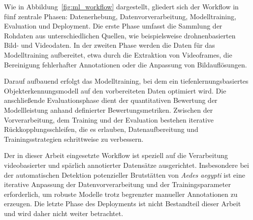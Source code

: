 Wie in Abbildung~\ref{fig:ml_workflow} dargestellt, gliedert sich der
Workflow in fünf zentrale Phasen: Datenerhebung, Datenvorverarbeitung,
Modelltraining, Evaluation und Deployment. Die erste Phase umfasst die
Sammlung der Rohdaten aus unterschiedlichen Quellen, wie beispielsweise
drohnenbasierten Bild- und Videodaten. In der zweiten Phase werden die
Daten für das Modelltraining aufbereitet, etwa durch die Extraktion von
Videoframes, die Bereinigung fehlerhafter Annotationen oder die
Anpassung von Bildauflösungen.

Darauf aufbauend erfolgt das Modelltraining, bei dem ein
tiefenlernungsbasiertes Objekterkennungsmodell auf den vorbereiteten
Daten optimiert wird. Die anschließende Evaluationsphase dient der
quantitativen Bewertung der Modellleistung anhand definierter
Bewertungsmetriken. Zwischen der Vorverarbeitung, dem Training und der
Evaluation bestehen iterative Rückkopplungsschleifen, die es erlauben,
Datenaufbereitung und Trainingsstrategien schrittweise zu verbessern.

Der in dieser Arbeit eingesetzte Workflow ist speziell auf die
Verarbeitung videobasierter und spärlich annotierter Datensätze
ausgerichtet. Insbesondere bei der automatischen Detektion potenzieller
Brutstätten von \textit{Aedes aegypti} ist eine iterative Anpassung der
Datenvorverarbeitung und der Trainingsparameter erforderlich, um
robuste Modelle trotz begrenzter manueller Annotationen zu erzeugen.
Die letzte Phase des Deployments ist nicht Bestandteil dieser Arbeit
und wird daher nicht weiter betrachtet.

